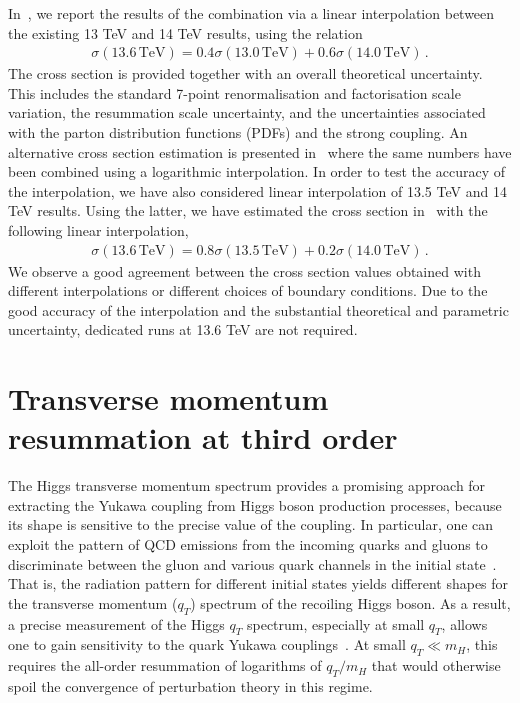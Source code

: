 \documentclass[11pt,a4paper]{article}
\begin{document}
In~, we report the results of the \nlonnllpart{} combination via a linear interpolation between the existing 13 TeV and 14 TeV results, using the relation
\begin{align}
\sigma(13.6\,\text{TeV})=0.4\sigma(13.0\,\text{TeV})+0.6\sigma(14.0\,\text{TeV})\,.
\end{align}
The cross section is provided together with an overall theoretical uncertainty. This includes the standard 7-point renormalisation and factorisation scale variation, the resummation scale uncertainty, and the uncertainties associated with the parton distribution functions (PDFs) and the strong coupling. An alternative cross section estimation is presented in~ where the same numbers have been combined using a logarithmic interpolation. In order to test the accuracy of the interpolation, we have also considered linear interpolation of 13.5 TeV and 14 TeV results. Using the latter, we have estimated the cross section in~ with the following linear interpolation,
\begin{align}
	\sigma(13.6\,\text{TeV})=0.8\sigma(13.5\,\text{TeV})+0.2\sigma(14.0\,\text{TeV})\,.
\end{align}
We observe a good agreement between the cross section values obtained with different interpolations or different choices of boundary conditions. Due to the good accuracy of the interpolation and the substantial theoretical and parametric uncertainty, dedicated runs at 13.6 TeV are not required.

\section{Transverse momentum resummation at third order}
\label{sec:resummation}
The Higgs transverse momentum spectrum provides a promising approach for extracting the Yukawa coupling from Higgs boson production processes, because its shape is sensitive to the precise value of the coupling.
In particular, one can exploit the pattern of QCD emissions from the incoming quarks and gluons to discriminate between the gluon and various quark channels in the initial state~\cite{Ebert:2016idf}.
That is, the radiation pattern for different initial states yields different shapes for the transverse momentum ($q_T$) spectrum of the recoiling Higgs boson. As a result, a precise measurement of the Higgs $q_T$ spectrum, especially at small $q_T$, allows one to gain sensitivity to the quark Yukawa couplings~\cite{Bishara:2016jga, Soreq:2016rae}.
At small $q_T \ll m_H$, this requires the all-order resummation of logarithms of $q_T/m_H$ that would otherwise spoil the convergence of perturbation theory in this regime.
\end{document}
